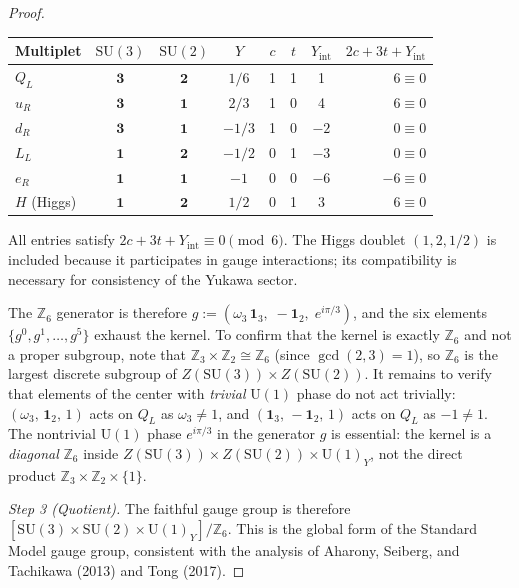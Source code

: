 \documentclass[11pt]{article}
\theoremstyle{definition}
\newcommand{\SU}{\mathrm{SU}}
\newcommand{\U}{\mathrm{U}}
\begin{document}
\begin{proof}
\smallskip
\begin{center}\small
\renewcommand{\arraystretch}{1.15}
\begin{tabular}{@{}lccccccr@{}}
\toprule
\textbf{Multiplet} & $\SU(3)$ & $\SU(2)$ & $Y$ &
  $c$ & $t$ & $Y_{\mathrm{int}}$ &
  $2c{+}3t{+}Y_{\mathrm{int}}$ \\
\midrule
$Q_L$ & $\mathbf{3}$ & $\mathbf{2}$ & $1/6$ & 1 & 1 & 1 & $6 \equiv 0$ \\
$u_R$ & $\mathbf{3}$ & $\mathbf{1}$ & $2/3$ & 1 & 0 & 4 & $6 \equiv 0$ \\
$d_R$ & $\mathbf{3}$ & $\mathbf{1}$ & $-1/3$ & 1 & 0 & $-2$ & $0 \equiv 0$ \\
$L_L$ & $\mathbf{1}$ & $\mathbf{2}$ & $-1/2$ & 0 & 1 & $-3$ & $0 \equiv 0$ \\
$e_R$ & $\mathbf{1}$ & $\mathbf{1}$ & $-1$ & 0 & 0 & $-6$ & $-6 \equiv 0$ \\
\midrule
$H$ (Higgs) & $\mathbf{1}$ & $\mathbf{2}$ & $1/2$ & 0 & 1 & 3 & $6 \equiv 0$ \\
\bottomrule
\end{tabular}
\end{center}

\smallskip\noindent All entries satisfy
$2c + 3t + Y_{\mathrm{int}} \equiv 0 \pmod{6}$.  The Higgs doublet
$(1, 2, 1/2)$ is included because it participates in gauge
interactions; its compatibility is necessary for consistency of the
Yukawa sector.

The $\mathbb{Z}_6$ generator is therefore
$g := (\omega_3\,\mathbf{1}_3,\; -\mathbf{1}_2,\;
e^{i\pi/3})$, and the six elements $\{g^0, g^1, \ldots, g^5\}$
exhaust the kernel.  To confirm that the kernel is exactly
$\mathbb{Z}_6$ and not a proper subgroup, note that
$\mathbb{Z}_3 \times \mathbb{Z}_2 \cong \mathbb{Z}_6$ (since
$\gcd(2,3) = 1$), so $\mathbb{Z}_6$ is the largest discrete
subgroup of $Z(\SU(3)) \times Z(\SU(2))$.  It remains to verify that
elements of the center with \emph{trivial} $\U(1)$ phase do not
act trivially: $(\omega_3,\, \mathbf{1}_2,\, 1)$ acts on $Q_L$ as
$\omega_3 \ne 1$, and $(\mathbf{1}_3,\, -\mathbf{1}_2,\, 1)$ acts
on $Q_L$ as $-1 \ne 1$.  The nontrivial $\U(1)$ phase
$e^{i\pi/3}$ in the generator $g$ is essential: the kernel is a
\emph{diagonal} $\mathbb{Z}_6$ inside
$Z(\SU(3)) \times Z(\SU(2)) \times \U(1)_Y$, not the direct
product $\mathbb{Z}_3 \times \mathbb{Z}_2 \times \{1\}$.

\textit{Step 3 (Quotient).}\quad
The faithful gauge group is therefore
$[\SU(3) \times \SU(2) \times \U(1)_Y] / \mathbb{Z}_6$.  This is
the global form of the Standard Model gauge group, consistent with the
analysis of Aharony, Seiberg, and Tachikawa (2013) and
Tong (2017).
\end{proof}
\end{document}
